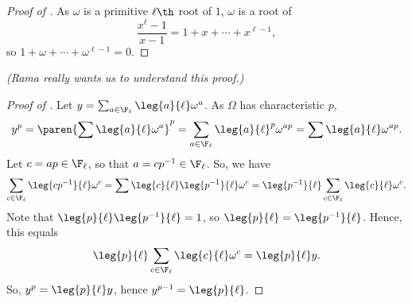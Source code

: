 \begin{proof}[Proof of ]
    As $\omega$ is a primitive $\ell\th$ root of $1$, $\omega$ is a root of
    $$\frac{x^\ell - 1}{x - 1} = 1 + x + \cdots + x^{\ell - 1},$$
    so $1 + \omega + \cdots + \omega^{\ell - 1} = 0$.
\end{proof}

\textit{(Rama really wants us to understand this proof.)}

\begin{proof}[Proof of ]
    Let $y = \sum_{a \in \F_\ell} \leg{a}{\ell} \omega^a$. As $\Omega$ has characteristic $p$,
    $$y^p = \paren{\sum \leg{a}{\ell} \omega^a}^p = \sum_{a \in \F_\ell} \leg{a}{\ell}^p \omega^{ap} = \sum \leg{a}{\ell} \omega^{ap}.$$
    Let $c = ap \in \F_\ell$, so that $a = cp^{-1} \in \F_\ell$. So, we have
    $$\sum_{c \in \F_\ell} \leg{cp^{-1}}{\ell} \omega^c = \sum \leg{c}{\ell}\leg{p^{-1}}{\ell} \omega^c = \leg{p^{-1}}{\ell} \sum_{c \in \F_\ell} \leg{c}{\ell} \omega^c.$$
    Note that $\leg{p}{\ell}\leg{p^{-1}}{\ell} = 1$, so $\leg{p}{\ell} = \leg{p^{-1}}{\ell}$. Hence, this equals
    $$\leg{p}{\ell} \sum_{c \in \F_\ell} \leg{c}{\ell} \omega^c = \leg{p}{\ell} y.$$
    So, $y^p = \leg{p}{\ell} y$, hence $y^{p-1} = \leg{p}{\ell}$.
\end{proof}

